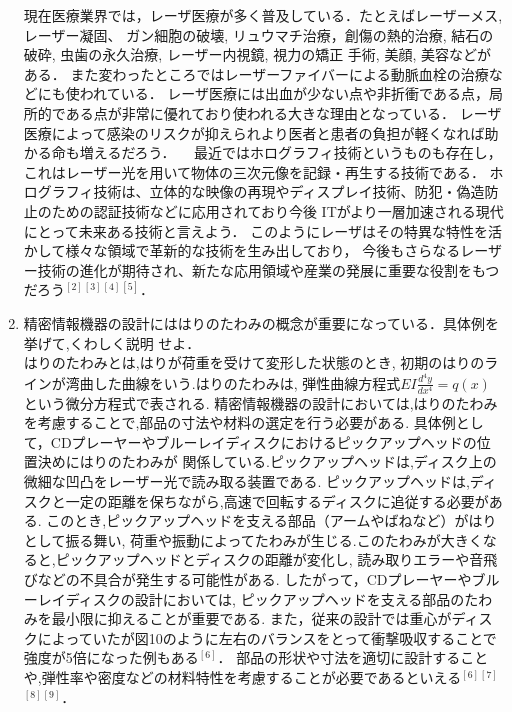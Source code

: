 \documentclass[a4paper,12pt]{jsarticle}
\begin{document}
\begin{enumerate}
現在医療業界では，レーザ医療が多く普及している．たとえばレーザーメス, レーザー凝固、 ガン細胞の破壊, リュウマチ治療，創傷の熱的治療, 
結石の破砕, 虫歯の永久治療, レーザー内視鏡, 視力の矯正 手術, 美顔, 美容などがある．
 また変わったところではレーザーファイバーによる動脈血栓の治療などにも使われている．
 レーザ医療には出血が少ない点や非折衝である点，局所的である点が非常に優れており使われる大きな理由となっている．
レーザ医療によって感染のリスクが抑えられより医者と患者の負担が軽くなれば助かる命も増えるだろう．
\quad　最近ではホログラフィ技術というものも存在し，これはレーザー光を用いて物体の三次元像を記録・再生する技術である．
ホログラフィ技術は、立体的な映像の再現やディスプレイ技術、防犯・偽造防止のための認証技術などに応用されており今後
ITがより一層加速される現代にとって未来ある技術と言えよう．
このようにレーザはその特異な特性を活かして様々な領域で革新的な技術を生み出しており，
今後もさらなるレーザー技術の進化が期待され、新たな応用領域や産業の発展に重要な役割をもつだろう$^{[2]}$$^{[3]}$$^{[4]}$$^{[5]}$．
\clearpage
\item 精密情報機器の設計にははりのたわみの概念が重要になっている．具体例を挙げて,くわしく説明
せよ．\\
\quad はりのたわみとは,はりが荷重を受けて変形した状態のとき,
初期のはりのラインが湾曲した曲線をいう.はりのたわみは,
弾性曲線方程式$EI \frac{{d^4y}}{{dx^4}} = q(x)$
という微分方程式で表される.
精密情報機器の設計においては,はりのたわみを考慮することで,部品の寸法や材料の選定を行う必要がある.
具体例として，CDプレーヤーやブルーレイディスクにおけるピックアップヘッドの位置決めにはりのたわみが
関係している.ピックアップヘッドは,ディスク上の微細な凹凸をレーザー光で読み取る装置である.
ピックアップヘッドは,ディスクと一定の距離を保ちながら,高速で回転するディスクに追従する必要がある.
このとき,ピックアップヘッドを支える部品（アームやばねなど）がはりとして振る舞い,
荷重や振動によってたわみが生じる.このたわみが大きくなると,ピックアップヘッドとディスクの距離が変化し,
読み取りエラーや音飛びなどの不具合が発生する可能性がある.
したがって，CDプレーヤーやブルーレイディスクの設計においては,
ピックアップヘッドを支える部品のたわみを最小限に抑えることが重要である.
また，従来の設計では重心がディスクによっていたが図10のように左右のバランスをとって衝撃吸収することで
強度が5倍になった例もある$^{[6]}$．
部品の形状や寸法を適切に設計することや,弾性率や密度などの材料特性を考慮することが必要であるといえる$^{[6]}$$^{[7]}$$^{[8]}$$^{[9]}$．



\end{enumerate}
\end{document}
